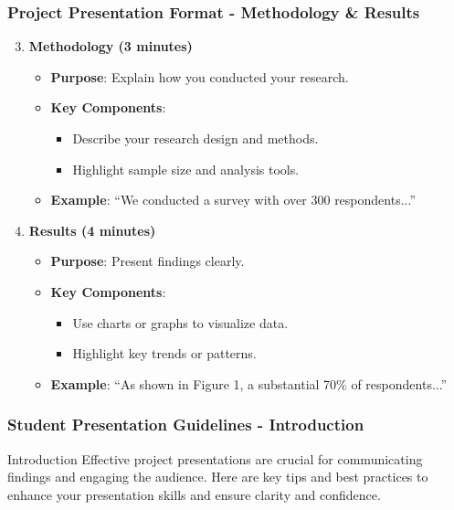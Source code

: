 \documentclass[aspectratio=169]{beamer}
\begin{document}
\begin{frame}[fragile]
    \frametitle{Project Presentation Format - Methodology & Results}
    \begin{enumerate}
        \setcounter{enumi}{2}
        \item \textbf{Methodology (3 minutes)}
        \begin{itemize}
            \item \textbf{Purpose}: Explain how you conducted your research.
            \item \textbf{Key Components}:
            \begin{itemize}
                \item Describe your research design and methods.
                \item Highlight sample size and analysis tools.
            \end{itemize}
            \item \textbf{Example}: ``We conducted a survey with over 300 respondents...''
        \end{itemize}

        \item \textbf{Results (4 minutes)}
        \begin{itemize}
            \item \textbf{Purpose}: Present findings clearly.
            \item \textbf{Key Components}:
            \begin{itemize}
                \item Use charts or graphs to visualize data.
                \item Highlight key trends or patterns.
            \end{itemize}
            \item \textbf{Example}: ``As shown in Figure 1, a substantial 70\% of respondents...'' 
        \end{itemize}
    \end{enumerate}
\end{frame}

\begin{frame}[fragile]
    \frametitle{Student Presentation Guidelines - Introduction}
    \begin{block}{Introduction}
        Effective project presentations are crucial for communicating findings and engaging the audience. Here are key tips and best practices to enhance your presentation skills and ensure clarity and confidence.
    \end{block}
\end{frame}
\end{document}
